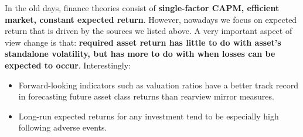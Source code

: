 \documentclass[10pt,portrait]{article}
\makeatletter
\renewcommand{\subsection}{\@startsection{subsection}{2}{0mm}%
                                {-1explus -.5ex minus -.2ex}%
                                {0.5ex plus .2ex}%
                                {\normalfont\normalsize\bfseries}}
\makeatother
\begin{document}
    In the old days, finance theories consist of \textbf{single-factor CAPM, efficient market, constant expected return}. However, nowadays we focus on expected return that is driven by the sources we listed above. A very important aspect of view change is that: \textbf{required asset return has little to do with asset's standalone volatility, but has more to do with when losses can be expected to occur}. Interestingly:
    \begin{itemize}
        \item Forward-looking indicators such as valuation ratios have a better track record in forecasting future asset class returns than rearview mirror measures.
        \item Long-run expected returns for any investment tend to be especially high following adverse events.
    \end{itemize}











\end{document}

